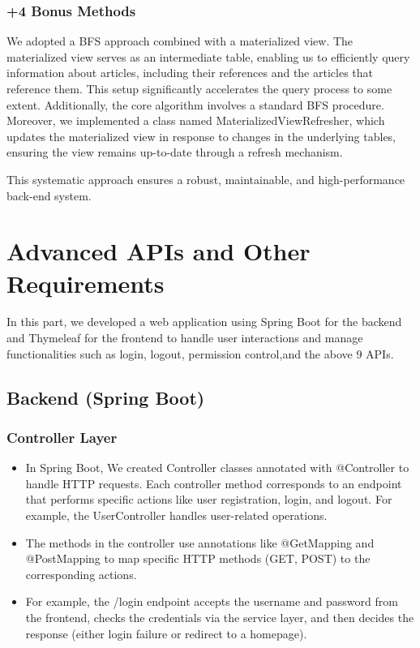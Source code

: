 \documentclass{article}
\begin{document}
\subsubsection*{\uppercase\expandafter{\romannumeral+4} Bonus Methods}
 
We adopted a BFS approach combined with a materialized view. The materialized view serves as an intermediate table, enabling us to efficiently query information about articles, including their references and the articles that reference them. This setup significantly accelerates the query process to some extent.
Additionally, the core algorithm involves a standard BFS procedure. 
Moreover, we implemented a class named MaterializedViewRefresher, which updates the materialized view in response to changes in the underlying tables, ensuring the view remains up-to-date through a refresh mechanism.

This systematic approach ensures a robust, maintainable, and high-performance back-end system.






\section{Advanced APIs and Other Requirements}
In this part, we developed a web application using Spring Boot for the backend and Thymeleaf for the frontend to handle user interactions and manage functionalities such as login, logout,  permission control,and the above 9 APIs.


\subsection{Backend (Spring Boot)}
\subsubsection{Controller Layer}
\begin{itemize}
    \item{In Spring Boot, We created Controller classes annotated with @Controller to handle HTTP requests. Each controller method corresponds to an endpoint that performs specific actions like user registration, login, and logout. For example, the UserController handles user-related operations.}
    \item{The methods in the controller use annotations like @GetMapping and @PostMapping to map specific HTTP methods (GET, POST) to the corresponding actions.}
    \item{For example, the /login endpoint accepts the username and password from the frontend, checks the credentials via the service layer, and then decides the response (either login failure or redirect to a homepage).}
\end{itemize}
\end{document}

